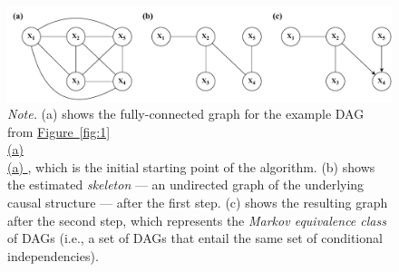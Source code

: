 \documentclass[twoside, 11pt]{article}
\newcommand*{\figref}[2][]{%
  \hyperref[{fig:#2}]{%
    Figure~\ref*{fig:#2}%
    \ifx\\#1\\%
    \else
      #1%
    \fi
  }%
}
\begin{document}

\begin{figure}[t]
    \centering
        \caption{Steps of a constraint-based method.}
        \includegraphics[width=1.0\textwidth]{figures/Fig2.pdf}
        \vspace{0.1mm}
        \caption*{\small{\textit{Note.} (a) shows the fully-connected graph for the example DAG from \figref[(a)]{1}, which is the initial starting point of the algorithm. (b) shows the estimated \textit{skeleton} --- an undirected graph of the underlying causal structure --- after the first step. (c) shows the resulting graph after the second step, which represents the \textit{Markov equivalence class} of DAGs (i.e., a set of DAGs that entail the same set of conditional independencies).}}
    \label{fig:2}
\end{figure}
\end{document}
